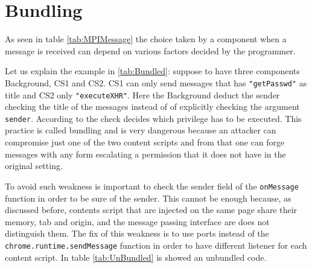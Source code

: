 \section{Bundling}
\label{sec:Bundling} 
As seen in table \ref{tab:MPIMessage} the choice taken by a component when a message is received can depend on various factors decided by the programmer.

Let us explain the example in \ref{tab:Bundled}: suppose to have three components Background, CS1 and CS2. CS1 can only send messages that has \texttt{"getPasswd"} as title and CS2 only \texttt{"executeXHR"}. Here the Background deduct the sender checking the title of the messages instead of of explicitly checking the argument \texttt{sender}. According to the check decides which privilege has to be executed. This practice is called bundling and is very dangerous because an attacker can compromise just one of the two content scripts and from that one can forge messages with any form escalating a permission that it does not have in the original setting.

To avoid such weakness is important to check the sender field of the \texttt{onMessage} function in order to be sure of the sender. This cannot be enough because, as discussed before, contents script that are injected on the same page share their memory, tab and origin, and the message passing interface are does not distinguish them. The fix of this weakness is to use ports instead of the \texttt{chrome.runtime.sendMessage} function in order to have different listener for each content script. In table \ref{tab:UnBundled} is showed an unbundled code.

